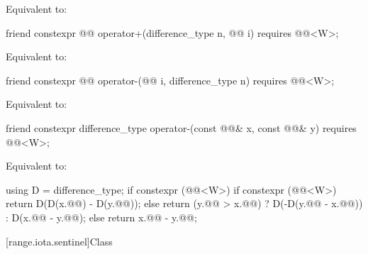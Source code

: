 \begin{itemdescr}
\pnum
\effects
Equivalent to: 
\end{itemdescr}

\begin{itemdecl}
friend constexpr @@ operator+(difference_type n, @@ i)
  requires @@<W>;
\end{itemdecl}

\begin{itemdescr}
\pnum
\effects
Equivalent to: 
\end{itemdescr}

\begin{itemdecl}
friend constexpr @@ operator-(@@ i, difference_type n)
  requires @@<W>;
\end{itemdecl}

\begin{itemdescr}
\pnum
\effects
Equivalent to: 
\end{itemdescr}

\begin{itemdecl}
friend constexpr difference_type operator-(const @@& x, const @@& y)
  requires @@<W>;
\end{itemdecl}

\begin{itemdescr}
\pnum
\effects
Equivalent to:
\begin{codeblock}
using D = difference_type;
if constexpr (@@<W>) {
  if constexpr (@@<W>)
    return D(D(x.@@) - D(y.@@));
  else
    return (y.@@ > x.@@)
      ? D(-D(y.@@ - x.@@))
      : D(x.@@ - y.@@);
} else {
  return x.@@ - y.@@;
}
\end{codeblock}
\end{itemdescr}

[range.iota.sentinel]{Class }


